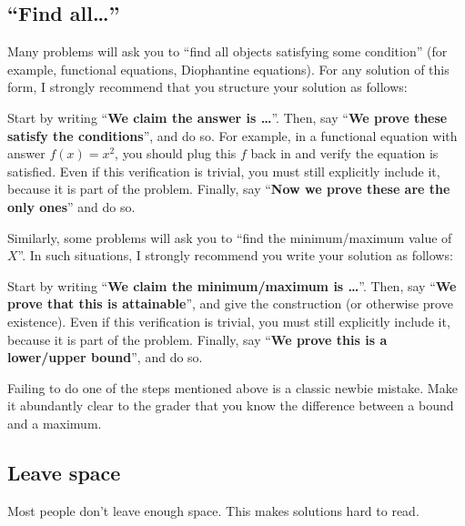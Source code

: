 \subsection{``Find all\dots''}
Many problems will ask you to ``find all objects satisfying some condition''
(for example, functional equations, Diophantine equations).
For any solution of this form, I strongly recommend that you
structure your solution as follows:
\begin{itemize}
	\ii Start by writing ``\textbf{We claim the answer is \dots}''.
	\ii Then, say ``\textbf{We prove these satisfy the conditions}'', and do so.
	For example, in a functional equation with answer $f(x) = x^2$,
	you should plug this $f$ back in and verify the equation is satisfied.
	Even if this verification is trivial,
	you must still explicitly include it,
	because it is part of the problem.
	\ii Finally, say ``\textbf{Now we prove these are the only ones}''
	and do so.
\end{itemize}

Similarly, some problems will ask you to
``find the minimum/maximum value of $X$''.
In such situations, I strongly recommend you write your solution as follows:
\begin{itemize}
	\ii Start by writing ``\textbf{We claim the minimum/maximum is \dots}''.
	\ii Then, say ``\textbf{We prove that this is attainable}'',
	and give the construction (or otherwise prove existence).
	Even if this verification is trivial,
	you must still explicitly include it,
	because it is part of the problem.
	\ii Finally, say ``\textbf{We prove this is a lower/upper bound}'', and do so.
\end{itemize}

Failing to do one of the steps mentioned above is a classic newbie mistake.
Make it abundantly clear to the grader that you know the difference
between a bound and a maximum.

\subsection{Leave space}
Most people don't leave enough space.
This makes solutions hard to read.

